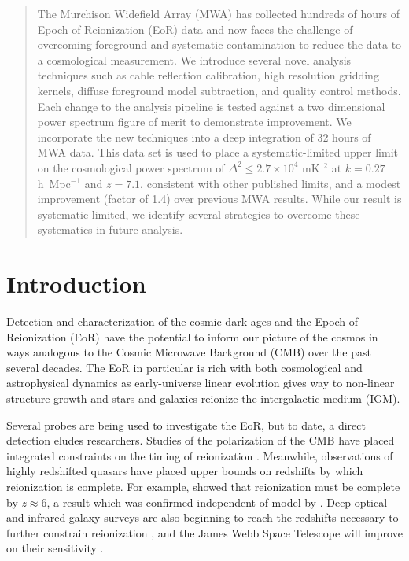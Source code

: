 \documentclass[iop]{emulateapj}
\begin{document}
\begin{abstract}
The Murchison Widefield Array (MWA) has collected hundreds of hours of Epoch of 
Reionization (EoR) data and now faces the challenge of overcoming foreground and 
systematic contamination to reduce the data to a cosmological measurement. We introduce 
several novel analysis techniques such as cable reflection calibration, high resolution 
gridding kernels, diffuse foreground model subtraction, and quality control methods. Each 
change to the analysis pipeline is tested against a two dimensional power spectrum figure 
of merit to demonstrate improvement. We incorporate the new techniques into a deep 
integration of 32 hours of MWA data. This data set is used to place a systematic-limited 
upper limit on the cosmological power spectrum of $\Delta^2 \leq 2.7 \times 10^4$ mK
$^2$ at $k=0.27$ h~Mpc$^{-1}$ and $z=7.1$, consistent with other published limits, and a 
modest improvement (factor of 1.4) over previous MWA results. While our result is 
systematic limited, we identify several strategies to overcome these systematics in future 
analysis.
\end{abstract}
\maketitle

\section{Introduction}

Detection and characterization of the cosmic dark ages and the Epoch of Reionization 
(EoR) have the potential to inform our picture of the cosmos in ways analogous to the 
Cosmic Microwave Background (CMB) over the past several decades. The EoR in 
particular is rich with both cosmological and astrophysical dynamics as early-universe linear 
evolution gives way to non-linear structure growth and stars and galaxies reionize the 
intergalactic medium (IGM).

Several probes are being used to investigate the EoR, but to date, a direct detection eludes 
researchers. Studies of the polarization of the CMB have placed integrated constraints on 
the timing of reionization \citep[e.g.][]{Planck:2015b, Planck:2015, WMAP9}. Meanwhile, 
observations of highly redshifted quasars have placed upper bounds on redshifts by which 
reionization is complete. For example, \citealt{Fan:2006a} showed that reionization must be 
complete by $z \approx 6$, a result which was confirmed independent of model by 
\citealt{McGreer:2015}. Deep optical and infrared galaxy surveys are also beginning to 
reach the redshifts necessary to further constrain reionization \citep[e.g.][]{Bouwens:2014}, 
and the James Webb Space Telescope will improve on their sensitivity 
\citep{Gardner:2006}.
\end{document}
